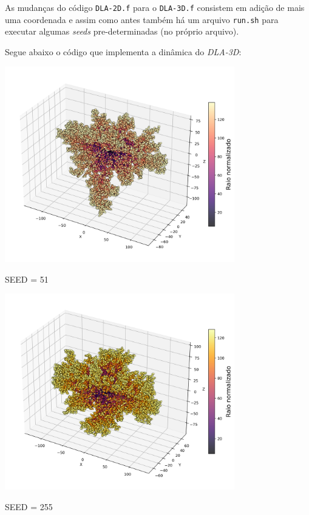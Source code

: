 \documentclass[a4paper, 11pt]{tufte-handout}
\begin{document}
As mudanças do código \verb|DLA-2D.f| para o \verb|DLA-3D.f| consistem em adição de mais uma
coordenada e assim como antes também há um arquivo \verb|run.sh| para executar algumas \emph{seeds}
pre-determinadas (no próprio arquivo).

Segue abaixo o código que implementa a dinâmica do \emph{DLA-3D}:

\begin{marginfigure}
  \centering
  \includegraphics[width=0.75\textwidth]{tarefa-3/DLA_3D-grafico-1.png}
  \caption{SEED = 51}
  \label{fig:dla_3d_seed1}
\end{marginfigure}

\begin{marginfigure}
  \centering
  \includegraphics[width=0.75\textwidth]{tarefa-3/DLA_3D-grafico-2.png}
  \caption{SEED = 255}
  \label{fig:dla_3d_seed2}
\end{marginfigure}
\end{document}
